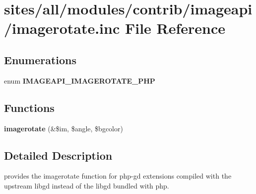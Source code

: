 \hypertarget{imagerotate_8inc}{
\section{sites/all/modules/contrib/imageapi/imagerotate.inc File Reference}
\label{imagerotate_8inc}
}
\subsection*{Enumerations}
\begin{CompactItemize}
\item 
enum \textbf{IMAGEAPI\_\-IMAGEROTATE\_\-PHP} 
\end{CompactItemize}
\subsection*{Functions}
\begin{CompactItemize}
\item 
\hypertarget{imagerotate_8inc_b311d59a5cf33143b985901c0a5e50cc}{
\textbf{imagerotate} (\&\$im, \$angle, \$bgcolor)}
\label{imagerotate_8inc_b311d59a5cf33143b985901c0a5e50cc}

\end{CompactItemize}


\subsection{Detailed Description}
provides the imagerotate function for php-gd extensions compiled with the upstream libgd instead of the libgd bundled with php. 